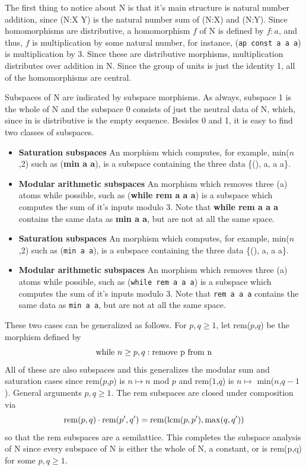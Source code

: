 \documentclass[11pt]{article}
\begin{document}
     The first thing to notice about N is that it's main structure is natural number addition, since (N:X Y) is the natural number sum of (N:X) and (N:Y).  Since homomorphisms are distributive, a homomorphism $f$ of N is defined by $f:a$, and thus, $f$ is multiplication by some natural number, for instance, (\texttt{ap const a a a}) is multiplication by 3.  Since these are distributive morphisms, multiplication distributes over addition in N.  Since the group of units is just the identity 1, all of the homomorphisms are central.  
     
    Subspaces of N are indicated by subspace morphisms.  As always, subspace 1 is the whole of N and the subspace 0 consists of just the neutral data of N, which, since in is distributive is the empty sequence.
Besides 0 and 1, it is easy to find two classes of subspaces.  
\begin{itemize} 
\item {\bf Saturation subspaces} An morphism which computes, for example, min($n$,2) such as ({\bf min a a}), is a subspace containing the three data \{(), a, a a\}. 
\item {\bf Modular arithmetic subspaces} An morphism which removes three (a) atoms while possible, such as ({\bf while rem a a a}) is a subspace which computes the sum of it's inputs modulo 3.  Note 
that {\bf while rem a a a} contains the same data as {\bf min a a}, but are not at all the same space. 
\end{itemize}
\begin{itemize} 
\item {\bf Saturation subspaces} An morphism which computes, for example, min($n$,2) such as (\texttt{min a a}), is a subspace containing the three data \{(), a, a a\}. 
\item {\bf Modular arithmetic subspaces} An morphism which removes three (a) atoms while possible, such as (\texttt{while rem a a a}) is a subspace which computes the sum of it's inputs modulo 3.  Note 
that \texttt{rem a a a} contains the same data as \texttt{min a a}, but are not at all the same space. 
\end{itemize}
These two cases can be generalized as follows.  For $p,q\ge 1$, let rem($p$,$q$) be the morphism defined by 
\begin{equation}
{\rm while}\ n\ge p,q: {\rm remove\ p\ from\ n}
\end{equation}
All of these are also subspaces and this generalizes the modular sum and saturation cases since rem($p$,$p$) is $n\mapsto n$ mod $p$ and rem($1$,$q$) is $n\mapsto$ min($n$,$q-1$).   General arguments $p,q\ge 1$.  The rem subspaces are closed under composition via 
\begin{equation}
{\rm rem}(p,q)\cdot {\rm rem}(p',q') = {\rm rem}({\rm lcm}(p,p'),{\rm max}(q,q'))
\end{equation}
so that the rem subspaces are a semilattice.  This completes the subspace analysis of N since every subspace of N is either the whole of N, a constant, or is rem(p,q) for some $p,q\ge1$. 
\end{document}
